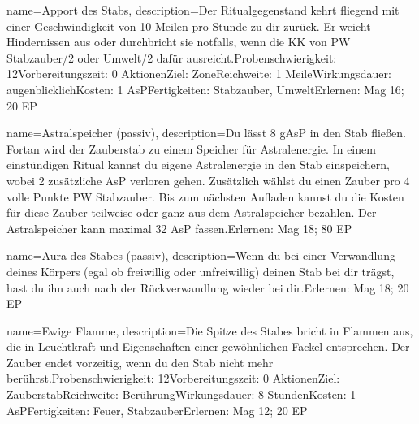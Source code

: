 {
    name={Apport des Stabs},
    description={Der Ritualgegenstand kehrt fliegend mit einer Geschwindigkeit von 10 Meilen pro Stunde zu dir zurück. Er weicht Hindernissen aus oder durchbricht sie notfalls, wenn die KK von PW Stabzauber/2 oder Umwelt/2 dafür ausreicht.\newline Probenschwierigkeit: 12\newline Vorbereitungszeit: 0 Aktionen\newline Ziel: Zone\newline Reichweite: 1 Meile\newline Wirkungsdauer: augenblicklich\newline Kosten: 1 AsP\newline Fertigkeiten: Stabzauber, Umwelt\newline Erlernen: Mag 16; 20 EP}
}


{
    name={Astralspeicher (passiv)},
    description={Du lässt 8 gAsP in den Stab fließen. Fortan wird der Zauberstab zu einem Speicher für Astralenergie. In einem einstündigen Ritual kannst du eigene Astralenergie in den Stab einspeichern, wobei 2 zusätzliche AsP verloren gehen. Zusätzlich wählst du einen Zauber pro 4 volle Punkte PW Stabzauber. Bis zum nächsten Aufladen kannst du die Kosten für diese Zauber teilweise oder ganz aus dem Astralspeicher bezahlen. Der Astralspeicher kann maximal 32 AsP fassen.\newline Erlernen: Mag 18; 80 EP}
}


{
    name={Aura des Stabes (passiv)},
    description={Wenn du bei einer Verwandlung deines Körpers (egal ob freiwillig oder unfreiwillig) deinen Stab bei dir trägst, hast du ihn auch nach der Rückverwandlung wieder bei dir.\newline Erlernen: Mag 18; 20 EP}
}


{
    name={Ewige Flamme},
    description={Die Spitze des Stabes bricht in Flammen aus, die in Leuchtkraft und Eigenschaften einer gewöhnlichen Fackel entsprechen. Der Zauber endet vorzeitig, wenn du den Stab nicht mehr berührst.\newline Probenschwierigkeit: 12\newline Vorbereitungszeit: 0 Aktionen\newline Ziel: Zauberstab\newline Reichweite: Berührung\newline Wirkungsdauer: 8 Stunden\newline Kosten: 1 AsP\newline Fertigkeiten: Feuer, Stabzauber\newline Erlernen: Mag 12; 20 EP}
}



